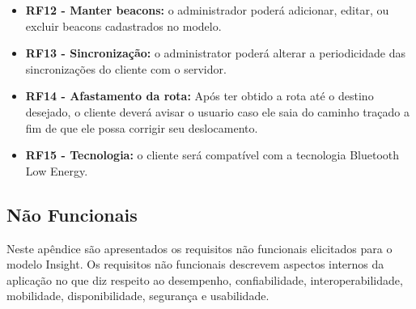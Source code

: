 \documentclass[twoside,english,brazilian]{UNISINOSartigo}
\begin{document}
\begin{itemize}
 	\item \textbf{RF12 - Manter beacons:} o administrador poderá adicionar, editar, ou excluir beacons cadastrados no modelo.

 	\item \textbf{RF13 - Sincronização:} o administrator poderá alterar a periodicidade das sincronizações do cliente com o servidor.

	\item \textbf{RF14 - Afastamento da rota:} Após ter obtido a rota até o destino desejado, o cliente deverá avisar o usuario caso ele saia do caminho traçado a fim de que ele possa corrigir seu deslocamento.

 	\item \textbf{RF15 - Tecnologia:} o cliente será compatível com a tecnologia Bluetooth Low Energy.
 \end{itemize}

 \subsection{Não Funcionais}
 Neste apêndice são apresentados os requisitos não funcionais elicitados para o modelo Insight. Os requisitos não funcionais descrevem aspectos internos da aplicação no que diz respeito ao desempenho, confiabilidade, interoperabilidade, mobilidade, disponibilidade, segurança e usabilidade.
\end{document}

